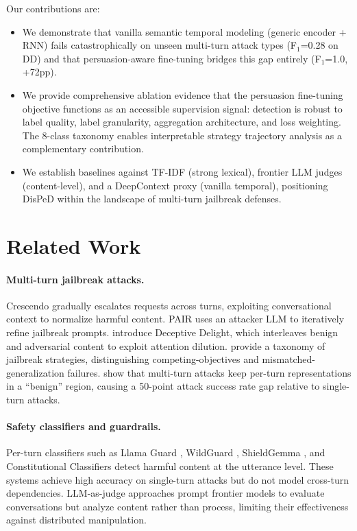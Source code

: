 \documentclass[11pt,a4paper]{article}
\newcommand{\ours}{DisPeD}
\newcommand{\fone}{F$_1$}
\begin{document}
Our contributions are:
\begin{itemize}
    \item We demonstrate that vanilla semantic temporal modeling (generic encoder + RNN) fails catastrophically on unseen multi-turn attack types (\fone{}=0.28 on DD) and that persuasion-aware fine-tuning bridges this gap entirely (\fone{}=1.0, +72pp).
    \item We provide comprehensive ablation evidence that the persuasion fine-tuning objective functions as an accessible supervision signal: detection is robust to label quality, label granularity, aggregation architecture, and loss weighting. The 8-class taxonomy enables interpretable strategy trajectory analysis as a complementary contribution.
    \item We establish baselines against TF-IDF (strong lexical), frontier LLM judges (content-level), and a DeepContext proxy (vanilla temporal), positioning \ours{} within the landscape of multi-turn jailbreak defenses.
\end{itemize}

\section{Related Work}

\paragraph{Multi-turn jailbreak attacks.}
Crescendo \citep{russinovich2024} gradually escalates requests across turns, exploiting conversational context to normalize harmful content.
PAIR \citep{chao2023} uses an attacker LLM to iteratively refine jailbreak prompts.
\citet{jiang2024} introduce Deceptive Delight, which interleaves benign and adversarial content to exploit attention dilution.
\citet{wei2024} provide a taxonomy of jailbreak strategies, distinguishing competing-objectives and mismatched-generalization failures.
\citet{bullwinkel2025} show that multi-turn attacks keep per-turn representations in a ``benign'' region, causing a 50-point attack success rate gap relative to single-turn attacks.

\paragraph{Safety classifiers and guardrails.}
Per-turn classifiers such as Llama Guard \citep{inan2023llamaguard}, WildGuard \citep{han2024wildguard}, ShieldGemma \citep{zeng2024shieldgemma}, and Constitutional Classifiers \citep{anthropic2024constitutional} detect harmful content at the utterance level.
These systems achieve high accuracy on single-turn attacks but do not model cross-turn dependencies.
LLM-as-judge approaches \citep{perez2022,ganguli2022} prompt frontier models to evaluate conversations but analyze content rather than process, limiting their effectiveness against distributed manipulation.
\end{document}
